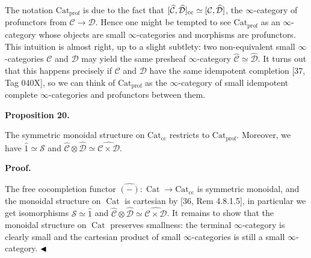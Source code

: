  
The notation $\operatorname{Cat_{prof}}$ is due to the fact that $[\widehat{\mathcal{C}},\widehat{\mathcal{D}}]_{\textnormal{cc}}\simeq[{\mathcal{C}},\widehat{\mathcal{D}}]$, the $\infty$-category of profunctors from ${\mathcal{C}}\to{\mathcal{D}}$. Hence one might be tempted to see $\operatorname{Cat_{prof}}$ as an $\infty$-category whose objects are small $\infty$-categories and morphisms are profunctors. This intuition is almost right, up to a slight subtlety: two non-equivalent small $\infty$-categories ${\mathcal{C}}$ and ${\mathcal{D}}$ may yield the same presheaf $\infty$-category $\widehat{\mathcal{C}}\simeq\widehat{\mathcal{D}}$. It turns out that this happens precisely if ${\mathcal{C}}$ and ${\mathcal{D}}$ have the same idempotent completion [37, Tag 040X], so we can think of $\operatorname{Cat_{prof}}$ as the $\infty$-category of small idempotent complete $\infty$-categories and profunctors between them.\par
 
 
 
 
\par\medskip\noindent\textbf{Proposition 20.}\par
 
 
The symmetric monoidal structure on $\operatorname{Cat_{cc}}$ restricts to $\operatorname{Cat_{prof}}$. Moreover, we have $\widehat{1}\simeq{\mathcal{S}}$ and $\widehat{\mathcal{C}}\otimes\widehat{\mathcal{D}}\simeq\widehat{{\mathcal{C}}\times{\mathcal{D}}}$.\par
 
 
 
 
 
\par\medskip\noindent\textbf{Proof.}\par
 
 
The free cocompletion functor $\widehat{(-)}:\operatorname{Cat}\to\operatorname{Cat_{cc}}$ is symmetric monoidal, and the monoidal structure on $\operatorname{Cat}$ is cartesian by [36, Rem 4.8.1.5], in particular we get isomorphisms ${\mathcal{S}}\simeq\widehat{1}$ and $\widehat{\mathcal{C}}\otimes\widehat{\mathcal{D}}\simeq\widehat{{\mathcal{C}}\times{\mathcal{D}}}$. It remains to show that the monoidal structure on $\operatorname{Cat}$ preserves smallness: the terminal $\infty$-category is clearly small and the cartesian product of small $\infty$-categories is still a small $\infty$-category. $\hfill\blacktriangleleft$\par
 
